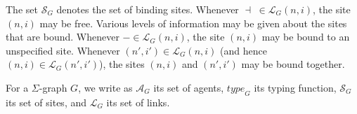 \documentclass{entcs}
\newcommand{\freesymbol}{\dashv}
\newcommand{\boundsymbol}{-}
\renewcommand{\bound}[1]{\boundsymbol}
\newcommand{\graphsymb}{G}
\newcommand{\agents}[1][\graphsymb]{\mathcal{A}_{#1}}
\newcommand{\type}[1][\graphsymb]{\textit{type}_{#1}}
\newcommand{\sites}[1][\graphsymb]{\mathcal{S}_{#1}}
\newcommand{\links}[1][\graphsymb]{\mathcal{L}_{#1}}
\begin{document}
The set $\sites$ denotes the set of binding sites.
Whenever $\freesymbol\;\in\links(n,i)$, the site $(n,i)$ may be free.
Various levels of information may be given about the sites that are bound.
Whenever $\bound{}\in\links(n,i)$, the site $(n,i)$ may be bound to an unspecified site.
Whenever $(n',i')\in\links(n,i)$ (and hence $(n,i)\in\links(n',i')$), the sites $(n,i)$ and $(n',i')$ may be bound together.

For a $\Sigma$-graph $\graphsymb$, we write as $\agents[\graphsymb]$ its set of agents, $\type[\graphsymb]$ its typing function, $\sites[\graphsymb]$ its set of sites, and $\links[\graphsymb]$ its set of links.

\end{document}
